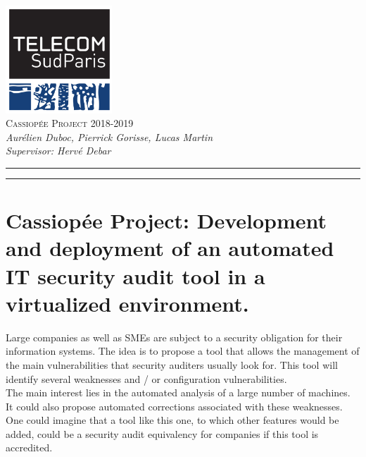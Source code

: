 
\thispagestyle{theme}

\newcolumntype{b}{X}
\usepackage{graphicx,lipsum}


\begin{center}

\includegraphics[width=0.3\textwidth]{images/logo.png} \\ \vspace{0.4cm}
{\huge \textsc{Cassiopée Project 2018-2019}} \\
  \textit{Aurélien Duboc, Pierrick Gorisse, Lucas Martin \\ Supervisor: Hervé Debar}

\end{center}

\noindent\rule{\textwidth}{.1pt}%
\tableofcontents
\noindent\rule{\textwidth}{.1pt}%

\section{Cassiopée Project: Development and deployment of an automated IT security audit tool in a
virtualized environment.}

\vspace{1cm}

Large companies as well as SMEs are subject to a security obligation
for their information systems. The idea is to propose a tool that allows the
management of the main vulnerabilities that security auditers usually look for.
This tool will identify several weaknesses and / or configuration vulnerabilities.
\\
The main interest lies in the automated analysis of a large number of machines. 
It could also propose automated corrections associated with these weaknesses. 
One could imagine that a tool like this one, to which other features would be 
added, could be a security audit equivalency for companies 
if this tool is accredited.
\pagebreak


